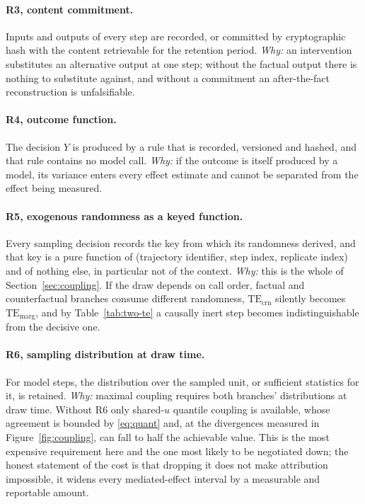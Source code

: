 \documentclass[11pt]{article}
\theoremstyle{remark}
\newcommand{\TEmarg}{\mathrm{TE}_{\mathrm{marg}}}
\newcommand{\TEcrn}{\mathrm{TE}_{\mathrm{crn}}}
\begin{document}
\paragraph{R3, content commitment.} Inputs and outputs of every step are recorded,
or committed by cryptographic hash with the content retrievable for the retention
period. \emph{Why:} an intervention substitutes an alternative output at one step;
without the factual output there is nothing to substitute against, and without a
commitment an after-the-fact reconstruction is unfalsifiable.

\paragraph{R4, outcome function.} The decision $Y$ is produced by a rule that is
recorded, versioned and hashed, and that rule contains no model call.
\emph{Why:} if the outcome is itself produced by a model, its variance enters
every effect estimate and cannot be separated from the effect being measured.

\paragraph{R5, exogenous randomness as a keyed function.} Every sampling decision
records the key from which its randomness derived, and that key is a pure
function of (trajectory identifier, step index, replicate index) and of nothing
else, in particular not of the context. \emph{Why:} this is the whole of
Section~\ref{sec:coupling}. If the draw depends on call order, factual and
counterfactual branches consume different randomness, $\TEcrn$ silently becomes
$\TEmarg$, and by Table~\ref{tab:two-te} a causally inert step becomes
indistinguishable from the decisive one.

\paragraph{R6, sampling distribution at draw time.} For model steps, the
distribution over the sampled unit, or sufficient statistics for it, is retained.
\emph{Why:} maximal coupling requires both branches' distributions at draw time.
Without R6 only shared-$u$ quantile coupling is available, whose agreement is
bounded by \eqref{eq:quant} and, at the divergences measured in
Figure~\ref{fig:coupling}, can fall to half the achievable value. This is the most
expensive requirement here and the one most likely to be negotiated down; the
honest statement of the cost is that dropping it does not make attribution
impossible, it widens every mediated-effect interval by a measurable and
reportable amount.
\end{document}
